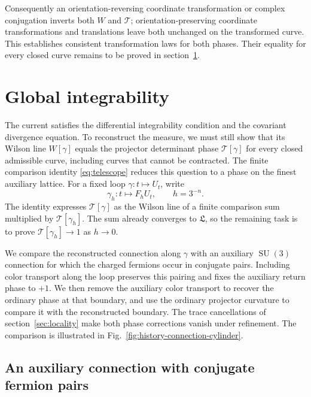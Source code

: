\documentclass[11pt,a4paper]{article}
\theoremstyle{remark}
\DeclareMathOperator{\SU}{SU}
\begin{document}
Consequently an orientation-reversing coordinate transformation or
complex conjugation inverts both $W$ and $\mathcal T$;
orientation-preserving coordinate transformations and translations leave both
unchanged on the transformed curve. This establishes consistent
transformation laws for both phases. Their equality for every closed
curve remains to be proved in section~\ref{sec:global}.
\section{Global integrability}
\label{sec:global}

The current satisfies the differential integrability condition and the
covariant divergence equation. To reconstruct the measure, we must still
show that its Wilson line $W[\gamma]$ equals the projector determinant
phase $\mathcal T[\gamma]$ for every closed admissible curve, including
curves that cannot be contracted. The finite comparison identity
\eqref{eq:telescope} reduces this question to a phase on the finest
auxiliary lattice. For a fixed loop $\gamma:t\mapsto U_t$, write
\begin{equation}
 \gamma_h:t\longmapsto F_hU_t,\qquad h=3^{-n}.
\end{equation}
The identity expresses $\mathcal T[\gamma]$ as the Wilson line of a
finite comparison sum multiplied by $\mathcal T[\gamma_h]$. The sum
already converges to $\mathfrak L$, so the remaining task is to prove
$\mathcal T[\gamma_h]\to1$ as $h\to0$.

We compare the reconstructed connection along $\gamma$ with an auxiliary
$\SU(3)$ connection for which the charged fermions occur in conjugate
pairs. Including color transport along the loop preserves this pairing
and fixes the auxiliary return phase to $+1$. We then remove the auxiliary color transport to recover the ordinary
phase at that boundary, and use the ordinary projector curvature to
compare it with the reconstructed boundary. The trace cancellations of section~\ref{sec:locality} make both
phase corrections vanish under refinement. The comparison is illustrated
in Fig.~\ref{fig:history-connection-cylinder}.

\subsection{An auxiliary connection with conjugate fermion pairs}
\end{document}
